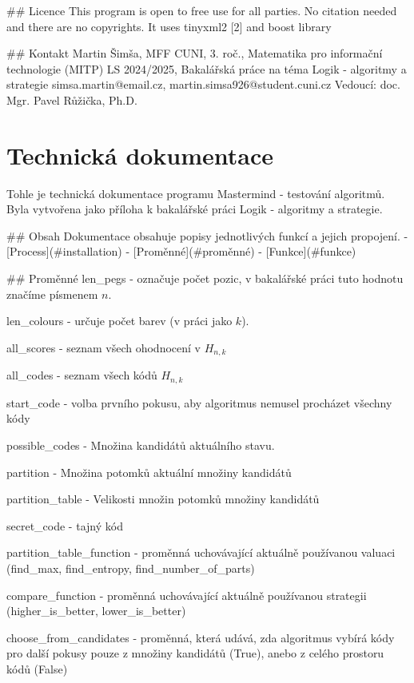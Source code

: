 \documentclass[12pt,a4paper]{article}
\begin{document}
## Licence
This program is open to free use for all parties. No citation needed and there are no copyrights. It uses tinyxml2 [2] and boost library 



## Kontakt
Martin Šimša, MFF CUNI, 3. roč., Matematika pro informační technologie (MITP)
LS 2024/2025, Bakalářská práce na téma Logik - algoritmy a strategie
simsa.martin@email.cz, martin.simsa926@student.cuni.cz
Vedoucí: doc. Mgr. Pavel Růžička, Ph.D.







\section{Technická dokumentace}
Tohle je technická dokumentace programu Mastermind - testování algoritmů. Byla vytvořena jako příloha k bakalářské práci Logik - algoritmy a strategie. 

## Obsah
Dokumentace obsahuje popisy jednotlivých funkcí a jejich propojení. 
- [Process](#installation)
- [Proměnné](#proměnné)
- [Funkce](#funkce)

## Proměnné
len_pegs - označuje počet pozic, v bakalářské práci tuto hodnotu značíme písmenem $n$.

len_colours - určuje počet barev (v práci jako $k$).

all_scores - seznam všech ohodnocení v $H_{n,k}$

all_codes - seznam všech kódů $H_{n,k}$

start_code - volba prvního pokusu, aby algoritmus nemusel procházet všechny kódy

possible_codes - Množina kandidátů aktuálního stavu.

partition - Množina potomků aktuální množiny kandidátů

partition_table - Velikosti množin potomků množiny kandidátů

secret_code - tajný kód

partition_table_function - proměnná uchovávající aktuálně používanou valuaci (find_max, find_entropy, find_number_of_parts)

compare_function - proměnná uchovávající aktuálně používanou strategii (higher_is_better, lower_is_better)

choose_from_candidates - proměnná, která udává, zda algoritmus vybírá kódy pro další pokusy pouze z množiny kandidátů (True), anebo z celého prostoru kódů (False)
\end{document}
